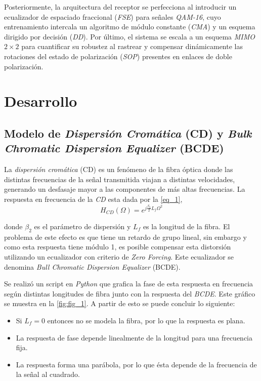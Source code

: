 \documentclass[12pt,a4paper]{article}
\begin{document}
Posteriormente, la arquitectura del receptor se perfecciona al introducir un ecualizador de espaciado fraccional (\textit{FSE}) para señales \textit{QAM-16}, cuyo entrenamiento intercala un algoritmo de módulo constante (\textit{CMA}) y un esquema dirigido por decisión (\textit{DD}). Por último, el sistema se escala a un esquema \textit{MIMO} $2 \times 2$ para cuantificar su robustez al rastrear y compensar dinámicamente las rotaciones del estado de polarización (\textit{SOP}) presentes en enlaces de doble polarización.



\section{Desarrollo}                                                \label{sec_2}
\subsection{Modelo de \textit{Dispersión Cromática} (CD) y \textit{Bulk Chromatic Dispersion Equalizer} (BCDE)}                   \label{sec_2.1}

La \emph{dispersión cromática} (CD) es un fenómeno de la fibra óptica donde las distintas frecuencias de la señal transmitida viajan a distintas velocidades, generando un desfasaje mayor a las componentes de más altas frecuencias. La respuesta en frecuencia de la \textit{CD} esta dada por la \autoref{eq_1},
\begin{equation}
    H_{CD} (\Omega) = {e^{j \frac{\beta_2}{2} L_f \Omega^2}}
    \label{eq_1}
\end{equation}

\noindent
donde $\beta_{2}$ es el parámetro de dispersión y $L_{f}$ es la longitud de la fibra. El problema de este efecto es que tiene un retardo de grupo lineal, sin embargo y como esta respuesta tiene módulo 1, es posible compensar esta distorsión utilizando un ecualizador con criterio de \emph{Zero Forcing}. Este ecualizador se denomina \emph{Bull Chromatic Dispersion Equalizer} (BCDE).

Se realizó un script en \textit{Python} \cite{b1} que grafica la fase de esta respuesta en frecuencia según distintas longitudes de fibra junto con la respuesta del \textit{BCDE}. Este gráfico se muestra en la \autoref{fig:fig_1}. A partir de esto se puede concluir lo siguiente:
\begin{itemize}
    \item Si $L_{f} = 0$ entonces no se modela la fibra, por lo que la respuesta es plana.
    \item La respuesta de fase depende linealmente de la longitud para una frecuencia fija.
    \item La respuesta forma una parábola, por lo que ésta depende de la frecuencia de la señal al cuadrado.
\end{itemize}
\end{document}
